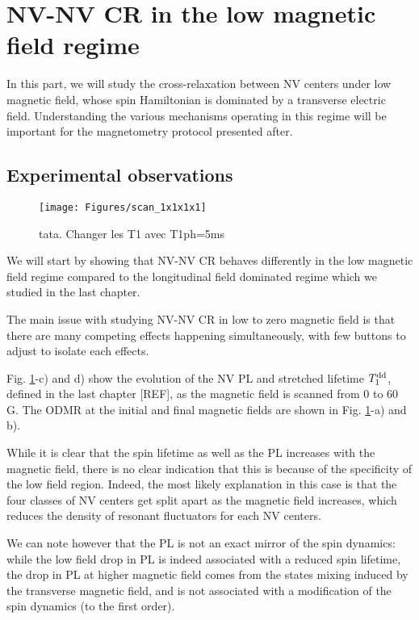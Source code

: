 \documentclass[a4paper,11pt]{report}
\begin{document}
\section{NV-NV CR in the low magnetic field regime}
In this part, we will study the cross-relaxation between NV centers under low magnetic field, whose spin Hamiltonian is dominated by a transverse electric field. Understanding the various mechanisms operating in this regime will be important for the magnetometry protocol presented after.

\subsection{Experimental observations}
\begin{figure}[h]
\centering
\texttt{[image: Figures/scan\_1x1x1x1]}
\caption{tata. Changer les T1 avec T1ph=5ms}
\label{scan 1x1x1x1}
\end{figure}
We will start by showing that NV-NV CR behaves differently in the low magnetic field regime compared to the longitudinal field dominated regime which we studied in the last chapter.

The main issue with studying NV-NV CR in low to zero magnetic field is that there are many competing effects happening simultaneously, with few buttons to adjust to isolate each effects.

Fig. \ref{scan 1x1x1x1}-c) and d) show the evolution of the NV PL and stretched lifetime $T_1^{\rm dd}$, defined in the last chapter [REF], as the magnetic field is scanned from 0 to 60 G. The ODMR at the initial and final magnetic fields are shown in Fig. \ref{scan 1x1x1x1}-a) and b).

While it is clear that the spin lifetime as well as the PL increases with the magnetic field, there is no clear indication that this is because of the specificity of the low field region. Indeed, the most likely explanation in this case is that the four classes of NV centers get split apart as the magnetic field increases, which reduces the density of resonant fluctuators for each NV centers. 

We can note however that the PL is not an exact mirror of the spin dynamics: while the low field drop in PL is indeed associated with a reduced spin lifetime, the drop in PL at higher magnetic field comes from the states mixing induced by the transverse magnetic field, and is not associated with a modification of the spin dynamics (to the first order).
\end{document}
